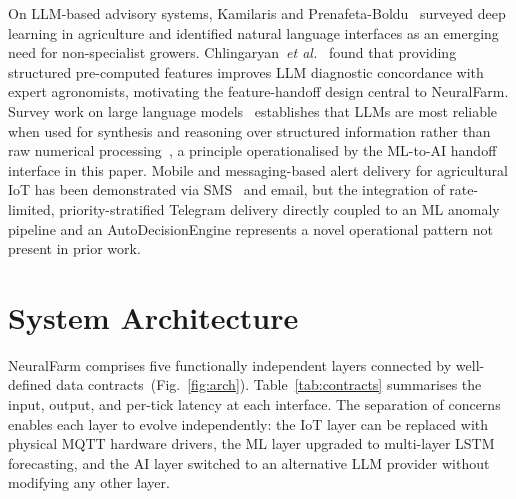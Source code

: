 \documentclass[journal,10pt,twocolumn]{IEEEtran}
\begin{document}
On LLM-based advisory systems, Kamilaris and
Prenafeta-Boldu~\cite{Kamilaris2018} surveyed deep learning in
agriculture and identified natural language interfaces as an emerging
need for non-specialist growers.
Chlingaryan~\textit{et al.}~\cite{Chlingaryan2018} found that
providing structured pre-computed features improves LLM diagnostic
concordance with expert agronomists, motivating the feature-handoff
design central to NeuralFarm. Survey work on large language
models~\cite{Zhao2023,Yang2024} establishes that LLMs are most reliable
when used for synthesis and reasoning over structured information rather
than raw numerical processing~\cite{Wei2022,Bender2021}, a principle
operationalised by the ML-to-AI handoff interface in this paper.
Mobile and messaging-based alert delivery for agricultural IoT has been
demonstrated via SMS~\cite{Farooq2020} and email, but the integration
of rate-limited, priority-stratified Telegram delivery directly coupled
to an ML anomaly pipeline and an AutoDecisionEngine represents a novel
operational pattern not present in prior work.

\section{System Architecture}
\label{sec:arch}

NeuralFarm comprises five functionally independent layers connected by
well-defined data contracts~(Fig.~\ref{fig:arch}).
Table~\ref{tab:contracts} summarises the input, output, and per-tick
latency at each interface. The separation of concerns enables each
layer to evolve independently: the IoT layer can be replaced with
physical MQTT hardware drivers, the ML layer upgraded to multi-layer
LSTM forecasting, and the AI layer switched to an alternative LLM
provider without modifying any other layer.
\end{document}
